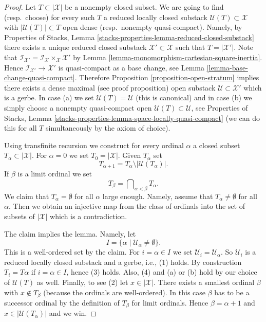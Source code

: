 \documentclass{stacks-project}
\theoremstyle{plain}
\theoremstyle{definition}
\theoremstyle{remark}
\numberwithin{equation}{subsection}
\begin{document}
\begin{proof}
Let $T \subset |\mathcal{X}|$ be a nonempty closed subset. We are going
to find (resp.\ choose) for every such $T$ a reduced locally closed substack
$\mathcal{U}(T) \subset \mathcal{X}$ with $|\mathcal{U}(T)| \subset T$
open dense (resp.\ nonempty quasi-compact). Namely, by
Properties of Stacks, Lemma
\ref{stacks-properties-lemma-reduced-closed-substack}
there exists a unique reduced closed substack
$\mathcal{X}' \subset \mathcal{X}$ such that $T = |\mathcal{X}'|$.
Note that $\mathcal{I}_{\mathcal{X}'} =
\mathcal{I}_\mathcal{X} \times_\mathcal{X} \mathcal{X}'$ by
Lemma \ref{lemma-monomorphism-cartesian-square-inertia}.
Hence $\mathcal{I}_{\mathcal{X}'} \to \mathcal{X}'$ is
quasi-compact as a base change, see
Lemma \ref{lemma-base-change-quasi-compact}.
Therefore
Proposition \ref{proposition-open-stratum}
implies there exists a dense maximal (see proof proposition)
open substack $\mathcal{U} \subset \mathcal{X}'$
which is a gerbe. In case (a) we set $\mathcal{U}(T) = \mathcal{U}$
(this is canonical) and in case (b) we simply choose a nonempty quasi-compact
open $\mathcal{U}(T) \subset \mathcal{U}$, see
Properties of Stacks, Lemma
\ref{stacks-properties-lemma-space-locally-quasi-compact}
(we can do this for all $T$
simultaneously by the axiom of choice).

\medskip\noindent
Using transfinite recursion we construct for every ordinal $\alpha$ a
closed subset $T_\alpha \subset |\mathcal{X}|$. For $\alpha = 0$
we set $T_0 = |\mathcal{X}|$. Given $T_\alpha$ set
$$
T_{\alpha + 1} = T_\alpha \setminus |\mathcal{U}(T_\alpha)|.
$$
If $\beta$ is a limit ordinal we set
$$
T_\beta = \bigcap\nolimits_{\alpha < \beta} T_\alpha.
$$
We claim that $T_\alpha = \emptyset$ for all $\alpha$
large enough. Namely, assume that $T_\alpha \not = \emptyset$
for all $\alpha$. Then we obtain an injective map from the class
of ordinals into the set of subsets of $|\mathcal{X}|$ which is a
contradiction.

\medskip\noindent
The claim implies the lemma. Namely, let
$$
I = \{\alpha \mid \mathcal{U}_\alpha \not = \emptyset \}.
$$
This is a well-ordered set by the claim. For $i = \alpha \in I$ we set
$\mathcal{U}_i = \mathcal{U}_\alpha$. So $\mathcal{U}_i$ is a reduced
locally closed substack and a gerbe, i.e., (1) holds. By construction
$T_i = T\alpha$ if $i = \alpha \in I$, hence (3) holds. Also, (4) and
(a) or (b) hold by our choice of $\mathcal{U}(T)$ as well. Finally, to see
(2) let $x \in |\mathcal{X}|$. There exists a smallest ordinal $\beta$
with $x \not \in T_\beta$ (because the ordinals are well-ordered).
In this case $\beta$ has to be a successor ordinal by the definition
of $T_\beta$ for limit ordinals. Hence $\beta = \alpha + 1$ and
$x \in |\mathcal{U}(T_\alpha)|$ and we win.
\end{proof}
\end{document}
